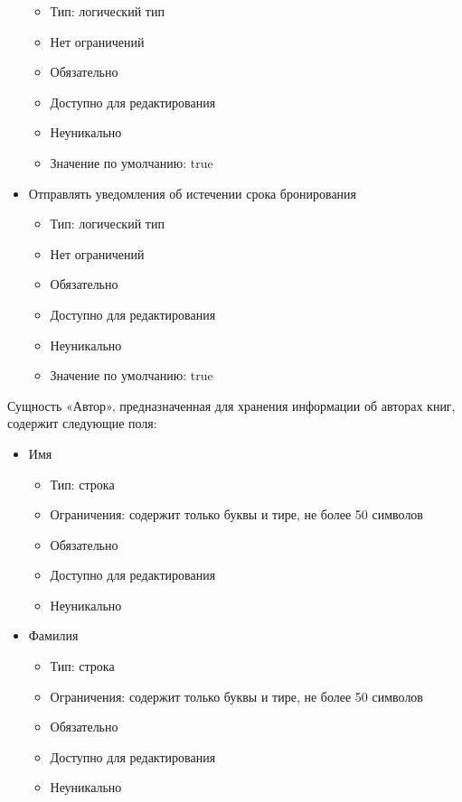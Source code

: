 \documentclass[data-specification.tex]{subfiles}
\begin{document}
\begin{itemize}
    \begin{itemize}
        \item Тип: логический тип
        \item Нет ограничений 
        \item Обязательно
        \item Доступно для редактирования
        \item Неуникально
        \item Значение по умолчанию: true
    \end{itemize}
    \item Отправлять уведомления об истечении срока бронирования
    \begin{itemize}
        \item Тип: логический тип
        \item Нет ограничений 
        \item Обязательно
        \item Доступно для редактирования
        \item Неуникально
        \item Значение по умолчанию: true
    \end{itemize}
\end{itemize}
\par
Сущность «Автор», предназначенная для хранения информации об авторах книг, содержит следующие поля:
\begin{itemize}
    \item Имя
    \begin{itemize}
        \item Тип: строка
        \item Ограничения: содержит только буквы и тире, не более 50 символов
        \item Обязательно
        \item Доступно для редактирования
        \item Неуникально
    \end{itemize}
    \item Фамилия
    \begin{itemize}
        \item Тип: строка
        \item Ограничения: содержит только буквы и тире, не более 50 символов
        \item Обязательно
        \item Доступно для редактирования
        \item Неуникально
    \end{itemize}
\end{itemize}
\end{document}
